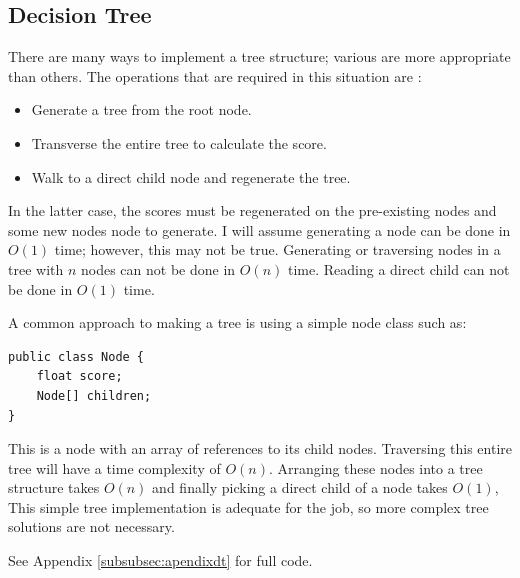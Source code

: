 \documentclass{article}
\begin{document}
\subsection{Decision Tree}
\label{subsec:dt}
There are many ways to implement a tree structure; various are more appropriate than others. The operations that are required in this situation are \cite{russell2010artificial}:
\begin{itemize}
    \item Generate a tree from the root node.
    \item Transverse the entire tree to calculate the score.
    \item Walk to a direct child node and regenerate the tree.
\end{itemize}
In the latter case, the scores  must be regenerated on the pre-existing nodes and some new nodes node to generate.
I will assume generating a node can be done in $O(1)$ time; however, this may not be true. Generating or traversing nodes in a tree with $n$ nodes can not be done in $O(n)$ time. Reading a direct child can not be done in $O(1)$ time.

A common approach to making a tree is using a simple node class such as:
\begin{verbatim}
public class Node {
    float score;
    Node[] children;
}
\end{verbatim}
This is a node with an array of references to its child nodes. Traversing this entire tree will have a time complexity of 
$O(n)$. Arranging these nodes into a tree structure takes $O(n)$ and finally picking a direct child of a node takes $O(1)$,
This simple tree implementation is adequate for the job, so more complex tree solutions are not necessary.

See Appendix \ref{subsubsec:apendixdt} for full code.
\end{document}
